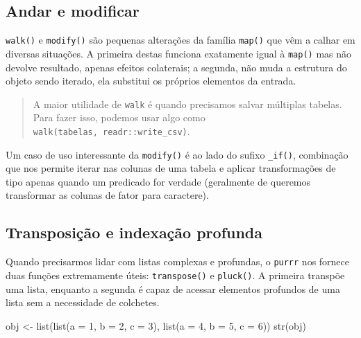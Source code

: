 \documentclass[
]{book}
\newenvironment{Shaded}{\begin{snugshade}}{\end{snugshade}}
\newcommand{\AttributeTok}[1]{\textcolor[rgb]{0.77,0.63,0.00}{#1}}
\newcommand{\DecValTok}[1]{\textcolor[rgb]{0.00,0.00,0.81}{#1}}
\newcommand{\FunctionTok}[1]{\textcolor[rgb]{0.00,0.00,0.00}{#1}}
\newcommand{\NormalTok}[1]{#1}
\newcommand{\OtherTok}[1]{\textcolor[rgb]{0.56,0.35,0.01}{#1}}
\begin{document}
\hypertarget{andar-e-modificar}{%
\subsection{Andar e modificar}\label{andar-e-modificar}}

\texttt{walk()} e \texttt{modify()} são pequenas alterações da família \texttt{map()} que vêm a calhar
em diversas situações. A primeira destas funciona exatamente igual à \texttt{map()} mas
não devolve resultado, apenas efeitos colaterais; a segunda, não muda a
estrutura do objeto sendo iterado, ela substitui os próprios elementos da entrada.

\begin{quote}
A maior utilidade de \texttt{walk} é quando precisamos salvar múltiplas
tabelas. Para fazer isso, podemos usar algo como
\texttt{walk(tabelas,\ readr::write\_csv)}.
\end{quote}

Um caso de uso interessante da \texttt{modify()} é ao lado do sufixo \texttt{\_if()},
combinação que nos permite iterar nas colunas de uma tabela e aplicar
transformações de tipo apenas quando um predicado for verdade (geralmente de
queremos transformar as colunas de fator para caractere).

\hypertarget{transposiuxe7uxe3o-e-indexauxe7uxe3o-profunda}{%
\subsection{Transposição e indexação profunda}\label{transposiuxe7uxe3o-e-indexauxe7uxe3o-profunda}}

Quando precisarmos lidar com listas complexas e profundas, o \texttt{purrr} nos fornece
duas funções extremamente úteis: \texttt{transpose()} e \texttt{pluck()}. A primeira transpõe
uma lista, enquanto a segunda é capaz de acessar elementos profundos de uma lista
sem a necessidade de colchetes.

\begin{Shaded}
\begin{Highlighting}[]
\NormalTok{obj }\OtherTok{\textless{}{-}} \FunctionTok{list}\NormalTok{(}\FunctionTok{list}\NormalTok{(}\AttributeTok{a =} \DecValTok{1}\NormalTok{, }\AttributeTok{b =} \DecValTok{2}\NormalTok{, }\AttributeTok{c =} \DecValTok{3}\NormalTok{), }\FunctionTok{list}\NormalTok{(}\AttributeTok{a =} \DecValTok{4}\NormalTok{, }\AttributeTok{b =} \DecValTok{5}\NormalTok{, }\AttributeTok{c =} \DecValTok{6}\NormalTok{))}
\FunctionTok{str}\NormalTok{(obj)}
\end{Highlighting}
\end{Shaded}
\end{document}
